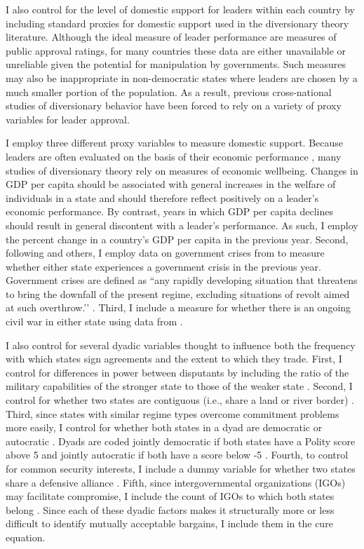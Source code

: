 \documentclass[../../dissertation.tex]{subfiles}
\begin{document}

I also control for the level of domestic support for leaders within each country by including standard proxies for domestic support used in the diversionary theory literature. Although the ideal measure of leader performance are measures of public approval ratings, for many countries these data are either unavailable or unreliable given the potential for manipulation by governments. Such measures may also be inappropriate in non-democratic states where leaders are chosen by a much smaller portion of the population. As a result, previous cross-national studies of diversionary behavior have been forced to rely on a variety of proxy variables for leader approval.

I employ three different proxy variables to measure domestic support. Because leaders are often evaluated on the basis of their economic performance \citep[e.g.][]{hibbs1987, mackuen1992}, many studies of diversionary theory rely on measures of economic wellbeing. Changes in GDP per capita should be associated with general increases in the welfare of individuals in a state and should therefore reflect positively on a leader's economic performance. By contrast, years in which GDP per capita declines should result in general discontent with a leader's performance. As such, I employ the percent change in a country’s GDP per capita in the previous year. Second, following \citet{enterline2000} and others, I employ data on government crises from \citet{banks2020} to measure whether either state experiences a government crisis in the previous year. Government crises are defined as ``any rapidly developing situation that threatens to bring the downfall of the present regime, excluding situations of revolt aimed at such overthrow.’’ \citep{zotero-4818}. Third, I include a measure for whether there is an ongoing civil war in either state using data from \citep{sarkees2010}.


I also control for several dyadic variables thought to influence both the frequency with which states sign agreements and the extent to which they trade. First, I control for differences in power between disputants by including the ratio of the military capabilities of the stronger state to those of the weaker state \citep{singer1972, singer1987}.   Second, I control for whether two states are contiguous (i.e., share a land or river border) \citep{stinnett2002}. Third, since states with similar regime types overcome commitment problems more easily, I control for whether both states in a dyad are democratic or autocratic \citep{leeds1999}. Dyads are coded jointly democratic if both states have a Polity score above 5 and jointly autocratic if both have a score below -5 \citep{marshall2002}. Fourth, to control for common security interests, I include a dummy variable for whether two states share a defensive alliance \citep{leeds2002}. Fifth, since intergovernmental organizations (IGOs) may facilitate compromise, I include the count of IGOs to which both states belong \citep{pevehouse2019}. Since each of these dyadic factors makes it structurally more or less difficult to identify mutually acceptable bargains, I include them in the cure equation. 
\end{document}
